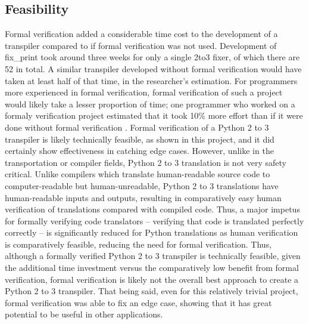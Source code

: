 \subsection{Feasibility}
Formal verification added a considerable time cost to the development of a transpiler compared to if formal verification was not used. Development of fix\_print took around three weeks for only a single 2to3 fixer, of which there are 52 in total. A similar transpiler developed without formal verification would have taken at least half of that time, in the researcher's estimation. For programmers more experienced in formal verification, formal verification of such a project would likely take a lesser proportion of time; one programmer who worked on a formaly verification project estimated that it took 10\% more effort than if it were done without formal verification \autocite{Woodcock}. Formal verification of a Python 2 to 3 transpiler is likely technically feasible, as shown in this project, and it did certainly show effectiveness in catching edge cases. However, unlike in the transportation or compiler fields, Python 2 to 3 translation is not very safety critical. Unlike compilers which translate human-readable source code to computer-readable but human-unreadable, Python 2 to 3 translations have human-readable inputs and outputs, resulting in comparatively easy human verification of translations compared with compiled code. Thus, a major impetus for formally verifying code translators -- verifying that code is translated perfectly correctly -- is significantly reduced for Python translations as human verification is comparatively feasible, reducing the need for formal verification. Thus, although a formally verified Python 2 to 3 transpiler is technically feasible, given the additional time investment versus the comparatively low benefit from formal verification, formal verification is likely not the overall best approach to create a Python 2 to 3 transpiler. That being said, even for this relatively trivial project, formal verification was able to fix an edge case, showing that it has great potential to be useful in other applications.